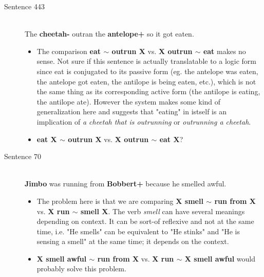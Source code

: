 \documentclass{article}
\begin{document}
\begin{description}
  \item[Sentence 443] \hfill \\
  The {\bf cheetah-} outran the {\bf antelope+} so it got eaten.
  \begin{itemize}
  	\item The comparison {\bf eat $\sim$ outrun X} vs. {\bf X outrun $\sim$ eat} makes no sense. Not sure if this sentence is actually translatable to a logic form since eat is conjugated to its passive form (eg. the antelope was eaten, the antelope got eaten, the antilope is being eaten, etc.), which is not the same thing as its corresponding active form (the antilope is eating, the antilope ate). However the system makes some kind of generalization here and suggests that "eating" in istself is an implication of {\it a cheetah that is outrunning} or {\it outrunning a cheetah}.
  	\item {\bf eat X $\sim$ outrun X} vs. {\bf X outrun $\sim$ eat X}?
  \end{itemize}

  \item[Sentence 70] \hfill \\
  {\bf Jimbo} was running from {\bf Bobbert+} because he smelled awful.
  \begin{itemize}
  	\item The problem here is that we are comparing {\bf X smell $\sim$ run from X} vs. {\bf X run $\sim$ smell X}. The verb {\it smell} can have several meanings depending on context. It can be sort-of reflexive and not at the same time, i.e. "He smells" can be equivalent to "He stinks" and "He is sensing a smell" at the same time; it depends on the context. 
  	\item {\bf X smell awful $\sim$ run from X} vs. {\bf X run $\sim$ X smell awful } would probably solve this problem.
  \end{itemize}


\end{description}
\end{document}

